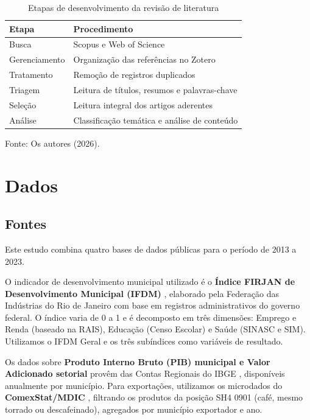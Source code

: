 \documentclass[12pt, a4paper]{article}
\begin{document}
\begin{table}[htbp]
\centering
\caption{Etapas de desenvolvimento da revisão de literatura}
\label{tab:prisma_etapas}
\begin{threeparttable}
\begin{tabular}{ll}
\toprule
\textbf{Etapa} & \textbf{Procedimento} \\
\midrule
Busca         & Scopus e Web of Science \\
Gerenciamento & Organização das referências no Zotero \\
Tratamento    & Remoção de registros duplicados \\
Triagem       & Leitura de títulos, resumos e palavras-chave \\
Seleção       & Leitura integral dos artigos aderentes \\
Análise       & Classificação temática e análise de conteúdo \\
\bottomrule
\end{tabular}
\begin{tablenotes}
\small
\item Fonte: Os autores (2026).
\end{tablenotes}
\end{threeparttable}
\end{table}

\section{Dados}

\subsection{Fontes}

Este estudo combina quatro bases de dados públicas para o período de 2013 a 2023.

O indicador de desenvolvimento municipal utilizado é o \textbf{Índice FIRJAN de Desenvolvimento Municipal (IFDM)} \citep{firjan2023}, elaborado pela Federação das Indústrias do Rio de Janeiro com base em registros administrativos do governo federal. O índice varia de 0 a 1 e é decomposto em três dimensões: Emprego e Renda (baseado na RAIS), Educação (Censo Escolar) e Saúde (SINASC e SIM). Utilizamos o IFDM Geral e os três subíndices como variáveis de resultado.

Os dados sobre \textbf{Produto Interno Bruto (PIB) municipal e Valor Adicionado setorial} provêm das Contas Regionais do IBGE \citep{ibge2023}, disponíveis anualmente por município. Para exportações, utilizamos os microdados do \textbf{ComexStat/MDIC} \citep{comexstat2024}, filtrando os produtos da posição SH4 0901 (café, mesmo torrado ou descafeinado), agregados por município exportador e ano.
\end{document}
